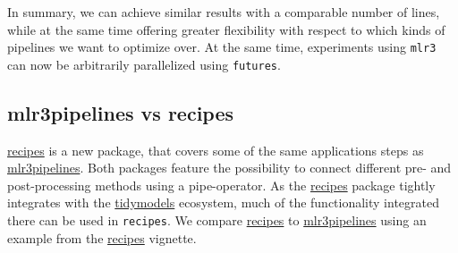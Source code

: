 \documentclass[
]{scrbook}
\newenvironment{Shaded}{\begin{snugshade}}{\end{snugshade}}
\newcommand{\AttributeTok}[1]{\textcolor[rgb]{0.77,0.63,0.00}{#1}}
\newcommand{\DecValTok}[1]{\textcolor[rgb]{0.00,0.00,0.81}{#1}}
\newcommand{\FunctionTok}[1]{\textcolor[rgb]{0.00,0.00,0.00}{#1}}
\newcommand{\NormalTok}[1]{#1}
\newcommand{\OtherTok}[1]{\textcolor[rgb]{0.56,0.35,0.01}{#1}}
\newcommand{\SpecialCharTok}[1]{\textcolor[rgb]{0.00,0.00,0.00}{#1}}
\newcommand{\StringTok}[1]{\textcolor[rgb]{0.31,0.60,0.02}{#1}}
\renewenvironment{Shaded} {\begin{snugshade}\small} {\end{snugshade}}
\begin{document}
\begin{Shaded}
\end{Shaded}

In summary, we can achieve similar results with a comparable number of lines, while at the same time offering greater flexibility with respect to which kinds of pipelines we want to optimize over.
At the same time, experiments using \texttt{mlr3} can now be arbitrarily parallelized using \texttt{futures}.

\hypertarget{mlr3pipelines-vs-recipes}{%
\subsection{mlr3pipelines vs recipes}\label{mlr3pipelines-vs-recipes}}

\href{https://cran.r-project.org/package=recipes}{recipes} is a new package, that covers some of the same applications steps as \href{https://cran.r-project.org/package=mlr3pipelines}{mlr3pipelines}.
Both packages feature the possibility to connect different pre- and post-processing methods using a pipe-operator.
As the \href{https://cran.r-project.org/package=recipes}{recipes} package tightly integrates with the \href{https://cran.r-project.org/package=tidymodels}{tidymodels} ecosystem, much of the functionality integrated there can be used in \texttt{recipes}.
We compare \href{https://cran.r-project.org/package=recipes}{recipes} to \href{https://cran.r-project.org/package=mlr3pipelines}{mlr3pipelines} using an example from the \href{https://cran.r-project.org/package=recipes}{recipes} vignette.
\end{document}
